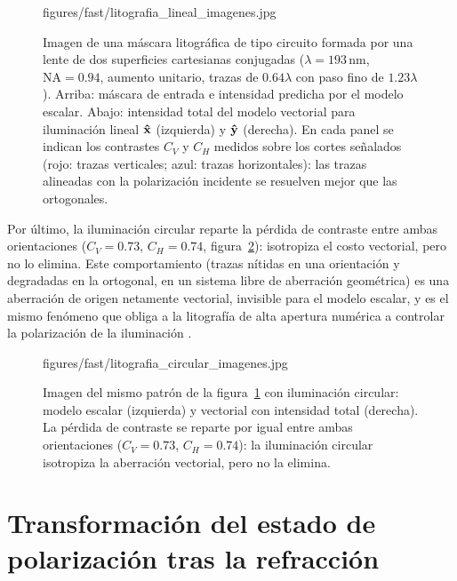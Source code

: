 \begin{figure}[H]
  \centering
    {figures/fast/litografia_lineal_imagenes.jpg}
  \caption{Imagen de una máscara litográfica de tipo circuito formada por una
  lente de dos superficies cartesianas conjugadas ($\lambda=193\,\mathrm{nm}$,
  $\mathrm{NA}=0.94$, aumento unitario, trazas de $0.64\lambda$ con paso fino
  de $1.23\lambda$). Arriba: máscara de entrada e intensidad predicha por el
  modelo escalar. Abajo: intensidad total del modelo vectorial para
  iluminación lineal $\bm{\hat{\mathbf{x}}}$ (izquierda) y $\bm{\hat{\mathbf{y}}}$
  (derecha). En cada panel se indican los contrastes $C_V$ y $C_H$ medidos
  sobre los cortes señalados (rojo: trazas verticales; azul: trazas
  horizontales): las trazas alineadas con la polarización incidente se
  resuelven mejor que las ortogonales.}
  \label{fig:lithography-general-non-axisymmetric}
\end{figure}

Por último, la iluminación circular reparte la pérdida de contraste entre ambas
orientaciones ($C_V=0.73$, $C_H=0.74$, figura~\ref{fig:lithography-circular}):
isotropiza el costo vectorial, pero no lo elimina. Este comportamiento (trazas
nítidas en una orientación y degradadas en la ortogonal, en un sistema libre de
aberración geométrica) es una aberración de origen netamente vectorial,
invisible para el modelo escalar, y es el mismo fenómeno que obliga a la
litografía de alta apertura numérica a controlar la polarización de la
iluminación \cite{flagello1996, ruoff2009}.

\begin{figure}[H]
  \centering
    {figures/fast/litografia_circular_imagenes.jpg}
  \caption{Imagen del mismo patrón de la
  figura~\ref{fig:lithography-general-non-axisymmetric} con iluminación
  circular: modelo escalar (izquierda) y vectorial con intensidad total
  (derecha). La pérdida de contraste se reparte por igual entre ambas
  orientaciones ($C_V=0.73$, $C_H=0.74$): la iluminación circular isotropiza
  la aberración vectorial, pero no la elimina.}
  \label{fig:lithography-circular}
\end{figure}

\section{Transformación del estado de polarización tras la refracción}
\label{subsec:polarizacion_refraccion}

